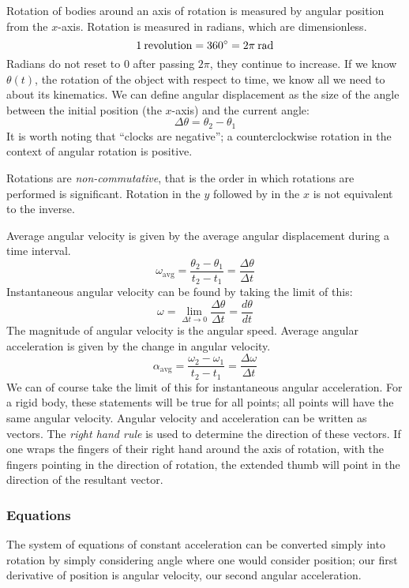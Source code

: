 \documentclass[12pt]{report}
\begin{document}
\begin{flushleft}
\bigskip
Rotation of bodies around an axis of rotation is measured by angular position 
from the \(x\)-axis. Rotation is measured in radians, which are dimensionless.
\[1 \:\mathrm{revolution} = 360\degree = 2\pi \:\mathrm{rad}\]
Radians do not reset to \(0\) after passing \(2\pi\), they continue to 
increase. If we know \(\theta(t)\), the rotation of the object with respect to
time, we know all we need to about its kinematics. We can define angular 
displacement as the size of the angle between the initial position 
(the \(x\)-axis) and the current angle:
\[\Delta\theta = \theta_2 - \theta_1\]
It is worth noting that ``clocks are negative''; a counterclockwise rotation in
the context of angular rotation is positive.

\bigskip
Rotations are \textit{non-commutative}, that is the order in which rotations
are performed is significant. Rotation in the \(y\) followed by in the \(x\)
is not equivalent to the inverse.

\bigskip
Average angular velocity is given by the average angular displacement during
a time interval.
\[\omega_{\mathrm{avg}} = \frac{\theta_2 - \theta_1}{t_2 - t_1}
 = \frac{\Delta\theta}{\Delta t}\]
Instantaneous angular velocity can be found by taking the limit of this:
\[\omega = \lim_{\Delta t \rightarrow 0} \frac{\Delta\theta}{\Delta t}
 = \frac{d\theta}{dt}\]
The magnitude of angular velocity is the angular speed. Average angular
acceleration is given by the change in angular velocity.
\[\alpha_{\mathrm{avg}} = \frac{\omega_2 - \omega_1}{t_2 - t_1}
 = \frac{\Delta\omega}{\Delta t}\]
We can of course take the limit of this for instantaneous angular acceleration.
For a rigid body, these statements will be true for all points; all points will
have the same angular velocity. Angular velocity and acceleration can be 
written as vectors. The \textit{right hand rule} is used to determine the 
direction of these vectors. If one wraps the fingers of their right hand around
the axis of rotation, with the fingers pointing in the direction of rotation,
the extended thumb will point in the direction of the resultant vector.

\subsubsection*{Equations}
The system of equations of constant acceleration can be converted simply into
rotation by simply considering angle where one would consider position; our
first derivative of position is angular velocity, our second angular 
acceleration.


\end{flushleft}
\end{document}
